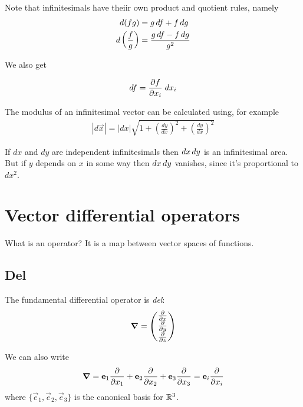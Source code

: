 \documentclass{../template/note}
\begin{document}
    Note that infinitesimals have theiir own product and quotient rules, namely
    \begin{align*}
        d(fg) &= g \,d{f} + f \,d{g} \\
        d\left(\frac f g\right) &= \frac{g \,d{f} - f \,d{g}}{g^2}
    \end{align*}

    We also get
    \begin{proposition}
        \label{1.3} \[
            df = \pd{f}{x_i} \; dx_i
        \]
    \end{proposition}
    
    
    The modulus of an infinitesimal vector can be calculated using, for example
    \begin{align*}
        |d \vec x| = |dx| \sqrt{1 + \left(\frac{dy}{dx}\right)^2 + \left(\frac{dy}{dx}\right)^2}
    \end{align*}
    
    If \(dx\) and \(dy\) are independent infinitesimals then \(dx \,d{y}\) is an infinitesimal area. But if \(y\) depends on \(x\) in some way then \(dx \,d{y}\) vanishes, since it's proportional to \(dx^2\).
    
    \section{Vector differential operators}
    
    \begin{remark*}
        What is an operator? It is a map between vector spaces of functions.
    \end{remark*}

    \subsection{Del}

    The fundamental differential operator is \emph{del}:
    \begin{align*}
        \grad = \begin{pmatrix}
         \pd{}{x} \\
         \pd{}{y} \\
         \pd{}{z} \\
        \end{pmatrix}
    \end{align*}
    
    We can also write
    \begin{align*}
        \grad = \vec e_1 \pd{}{x_1} + \vec e_2 \pd{}{x_2} + \vec e_3 \pd{}{x_3} = \vec e_i \pd{}{x_i}
    \end{align*}
    where \(\{\vec e_1, \vec e_2, \vec e_3\}\) is the canonical basis for \(\mathbb R^3\).
    
\end{document}
